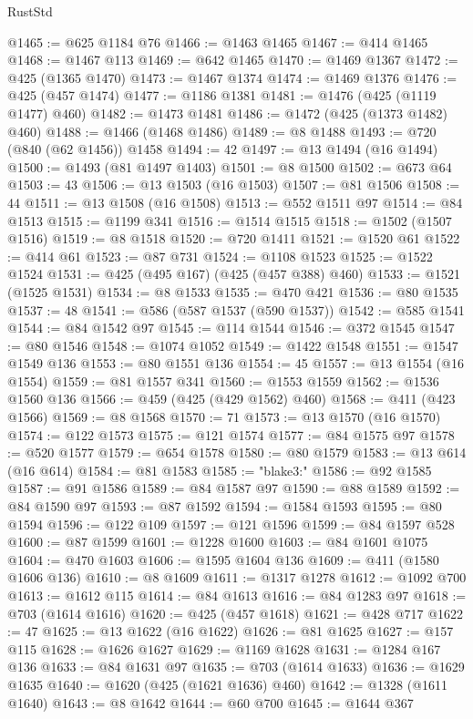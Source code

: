 \begin{lexlean}{RustStd}
\begin{coremodule}
@1465 := @625 @1184 @76
@1466 := @1463 @1465
@1467 := @414 @1465
@1468 := @1467 @113
@1469 := @642 @1465
@1470 := @1469 @1367
@1472 := @425 (@1365 @1470)
@1473 := @1467 @1374
@1474 := @1469 @1376
@1476 := @425 (@457 @1474)
@1477 := @1186 @1381
@1481 := @1476 (@425 (@1119 @1477) @460)
@1482 := @1473 @1481
@1486 := @1472 (@425 (@1373 @1482) @460)
@1488 := @1466 (@1468 @1486)
@1489 := @8 @1488
@1493 := @720 (@840 (@62 @1456)) @1458
@1494 := 42
@1497 := @13 @1494 (@16 @1494)
@1500 := @1493 (@81 @1497 @1403)
@1501 := @8 @1500
@1502 := @673 @64
@1503 := 43
@1506 := @13 @1503 (@16 @1503)
@1507 := @81 @1506
@1508 := 44
@1511 := @13 @1508 (@16 @1508)
@1513 := @552 @1511 @97
@1514 := @84 @1513
@1515 := @1199 @341
@1516 := @1514 @1515
@1518 := @1502 (@1507 @1516)
@1519 := @8 @1518
@1520 := @720 @1411
@1521 := @1520 @61
@1522 := @414 @61
@1523 := @87 @731
@1524 := @1108 @1523
@1525 := @1522 @1524
@1531 := @425 (@495 @167) (@425 (@457 @388) @460)
@1533 := @1521 (@1525 @1531)
@1534 := @8 @1533
@1535 := @470 @421
@1536 := @80 @1535
@1537 := 48
@1541 := @586 (@587 @1537 (@590 @1537))
@1542 := @585 @1541
@1544 := @84 @1542 @97
@1545 := @114 @1544
@1546 := @372 @1545
@1547 := @80 @1546
@1548 := @1074 @1052
@1549 := @1422 @1548
@1551 := @1547 @1549 @136
@1553 := @80 @1551 @136
@1554 := 45
@1557 := @13 @1554 (@16 @1554)
@1559 := @81 @1557 @341
@1560 := @1553 @1559
@1562 := @1536 @1560 @136
@1566 := @459 (@425 (@429 @1562) @460)
@1568 := @411 (@423 @1566)
@1569 := @8 @1568
@1570 := 71
@1573 := @13 @1570 (@16 @1570)
@1574 := @122 @1573
@1575 := @121 @1574
@1577 := @84 @1575 @97
@1578 := @520 @1577
@1579 := @654 @1578
@1580 := @80 @1579
@1583 := @13 @614 (@16 @614)
@1584 := @81 @1583
@1585 := "blake3:"
@1586 := @92 @1585
@1587 := @91 @1586
@1589 := @84 @1587 @97
@1590 := @88 @1589
@1592 := @84 @1590 @97
@1593 := @87 @1592
@1594 := @1584 @1593
@1595 := @80 @1594
@1596 := @122 @109
@1597 := @121 @1596
@1599 := @84 @1597 @528
@1600 := @87 @1599
@1601 := @1228 @1600
@1603 := @84 @1601 @1075
@1604 := @470 @1603
@1606 := @1595 @1604 @136
@1609 := @411 (@1580 @1606 @136)
@1610 := @8 @1609
@1611 := @1317 @1278
@1612 := @1092 @700
@1613 := @1612 @115
@1614 := @84 @1613
@1616 := @84 @1283 @97
@1618 := @703 (@1614 @1616)
@1620 := @425 (@457 @1618)
@1621 := @428 @717
@1622 := 47
@1625 := @13 @1622 (@16 @1622)
@1626 := @81 @1625
@1627 := @157 @115
@1628 := @1626 @1627
@1629 := @1169 @1628
@1631 := @1284 @167 @136
@1633 := @84 @1631 @97
@1635 := @703 (@1614 @1633)
@1636 := @1629 @1635
@1640 := @1620 (@425 (@1621 @1636) @460)
@1642 := @1328 (@1611 @1640)
@1643 := @8 @1642
@1644 := @60 @700
@1645 := @1644 @367

\end{coremodule}
\end{lexlean}
